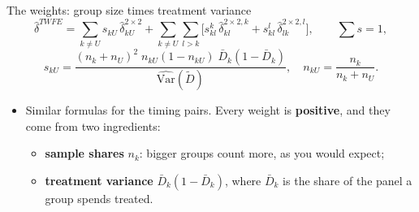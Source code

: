 \documentclass[
  11pt,
  ignorenonframetext,
  aspectratio=169,
]{beamer}
\providecommand{\tightlist}{%
  \setlength{\itemsep}{0pt}\setlength{\parskip}{0pt}}
\begin{document}
\begin{frame}{The weights: group size times treatment variance}
\protect{}\label{the-weights-group-size-times-treatment-variance}
\[
\hat\delta^{TWFE} = \sum_{k \ne U} s_{kU}\,\hat\delta^{2\times2}_{kU} + \sum_{k \ne U}\sum_{l > k}\big[s^{k}_{kl}\,\hat\delta^{2\times2,k}_{kl} + s^{l}_{kl}\,\hat\delta^{2\times2,l}_{lk}\big], \qquad \sum s = 1,
\] \[
s_{kU} = \frac{(n_k + n_U)^2\; n_{kU}(1 - n_{kU})\; \bar D_k(1 - \bar D_k)}{\widehat{\text{Var}}(\tilde D)}, \quad n_{kU} = \frac{n_k}{n_k + n_U}.
\]

\begin{itemize}
\tightlist
\item
  Similar formulas for the timing pairs. Every weight is
  \textbf{positive}, and they come from two ingredients:

  \begin{itemize}
  \tightlist
  \item
    \textbf{sample shares} \(n_k\): bigger groups count more, as you
    would expect;
  \item
    \textbf{treatment variance} \(\bar D_k(1-\bar D_k)\), where
    \(\bar D_k\) is the share of the panel a group spends treated.
  \end{itemize}
\end{itemize}
\end{frame}
\end{document}
